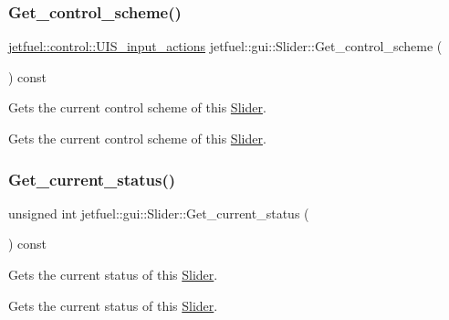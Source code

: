 \subsubsection{\texorpdfstring{Get\+\_\+control\+\_\+scheme()}{Get\_control\_scheme()}}
{\footnotesize\ttfamily \hyperlink{structjetfuel_1_1control_1_1UIS__input__actions}{jetfuel\+::control\+::\+U\+I\+S\+\_\+input\+\_\+actions} jetfuel\+::gui\+::\+Slider\+::\+Get\+\_\+control\+\_\+scheme (\begin{DoxyParamCaption}{ }\end{DoxyParamCaption}) const\hspace{0.3cm}{\ttfamily [inline]}}



Gets the current control scheme of this \hyperlink{classjetfuel_1_1gui_1_1Slider}{Slider}. 

Gets the current control scheme of this \hyperlink{classjetfuel_1_1gui_1_1Slider}{Slider}. \mbox{\label{classjetfuel_1_1gui_1_1Slider_a62ef1133fbbea679b51d7ecf4ba4b6a8}} 
\subsubsection{\texorpdfstring{Get\+\_\+current\+\_\+status()}{Get\_current\_status()}}
{\footnotesize\ttfamily unsigned int jetfuel\+::gui\+::\+Slider\+::\+Get\+\_\+current\+\_\+status (\begin{DoxyParamCaption}{ }\end{DoxyParamCaption}) const\hspace{0.3cm}{\ttfamily [inline]}}



Gets the current status of this \hyperlink{classjetfuel_1_1gui_1_1Slider}{Slider}. 

Gets the current status of this \hyperlink{classjetfuel_1_1gui_1_1Slider}{Slider}. \mbox{\label{classjetfuel_1_1gui_1_1Slider_a6cb71758be2833e86c9fc80c457b4b24}} 
